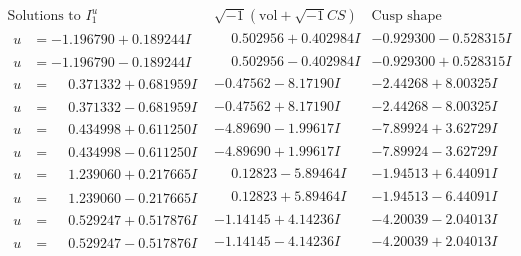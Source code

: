 \documentclass[1p]{elsarticle_modified}
\theoremstyle{definition}
\newcommand{\I}{\sqrt{-1}}
\begin{document}
$$\begin{array}{c|c|c}  
\text{Solutions to }I^u_{1}& \I (\text{vol} + \sqrt{-1}CS) & \text{Cusp shape}\\
 \hline 
\begin{aligned}
u &= -1.196790 + 0.189244 I\end{aligned}
 & \phantom{-}0.502956 + 0.402984 I & -0.929300 - 0.528315 I \\ \hline\begin{aligned}
u &= -1.196790 - 0.189244 I\end{aligned}
 & \phantom{-}0.502956 - 0.402984 I & -0.929300 + 0.528315 I \\ \hline\begin{aligned}
u &= \phantom{-}0.371332 + 0.681959 I\end{aligned}
 & -0.47562 - 8.17190 I & -2.44268 + 8.00325 I \\ \hline\begin{aligned}
u &= \phantom{-}0.371332 - 0.681959 I\end{aligned}
 & -0.47562 + 8.17190 I & -2.44268 - 8.00325 I \\ \hline\begin{aligned}
u &= \phantom{-}0.434998 + 0.611250 I\end{aligned}
 & -4.89690 - 1.99617 I & -7.89924 + 3.62729 I \\ \hline\begin{aligned}
u &= \phantom{-}0.434998 - 0.611250 I\end{aligned}
 & -4.89690 + 1.99617 I & -7.89924 - 3.62729 I \\ \hline\begin{aligned}
u &= \phantom{-}1.239060 + 0.217665 I\end{aligned}
 & \phantom{-}0.12823 - 5.89464 I & -1.94513 + 6.44091 I \\ \hline\begin{aligned}
u &= \phantom{-}1.239060 - 0.217665 I\end{aligned}
 & \phantom{-}0.12823 + 5.89464 I & -1.94513 - 6.44091 I \\ \hline\begin{aligned}
u &= \phantom{-}0.529247 + 0.517876 I\end{aligned}
 & -1.14145 + 4.14236 I & -4.20039 - 2.04013 I \\ \hline\begin{aligned}
u &= \phantom{-}0.529247 - 0.517876 I\end{aligned}
 & -1.14145 - 4.14236 I & -4.20039 + 2.04013 I \\ \hline\begin{aligned}

\end{aligned}
\end{array}$$
\end{document}
